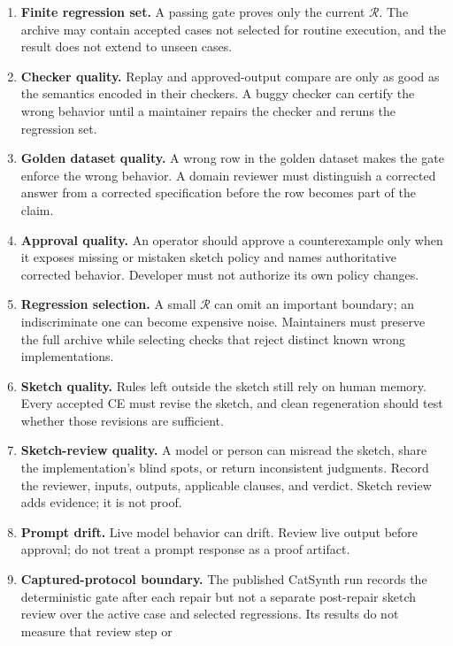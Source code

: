 \documentclass[11pt]{article}
\newcommand{\regression}{\mathcal{R}}
\begin{document}
\begin{enumerate}
  \item \textbf{Finite regression set.}  A passing gate proves only the current
        $\regression$.  The archive may contain accepted cases not selected for routine
        execution, and the result does not extend to unseen cases.
  \item \textbf{Checker quality.}  Replay and approved-output compare are only as good as the
        semantics encoded in their checkers.  A buggy checker can certify the wrong
        behavior until a maintainer repairs the checker and reruns the regression set.
  \item \textbf{Golden dataset quality.}  A wrong row in the golden dataset makes
        the gate enforce the wrong behavior.  A domain reviewer must distinguish a
        corrected answer from a corrected specification before the row becomes part
        of the claim.
  \item \textbf{Approval quality.}  An operator should approve a counterexample only when it
        exposes missing or mistaken sketch policy and names authoritative corrected behavior.
        Developer must not authorize its own policy changes.
  \item \textbf{Regression selection.}  A small $\regression$ can omit an important boundary;
        an indiscriminate one can become expensive noise.  Maintainers must preserve the full
        archive while selecting checks that reject distinct known wrong implementations.
  \item \textbf{Sketch quality.}  Rules left outside the sketch still rely on human memory.
        Every accepted CE must revise the sketch, and clean regeneration should test whether
        those revisions are sufficient.
  \item \textbf{Sketch-review quality.}  A model or person can misread the sketch, share the
        implementation's blind spots, or return inconsistent judgments.  Record the reviewer,
        inputs, outputs, applicable clauses, and verdict.  Sketch review adds evidence; it is not
        proof.
  \item \textbf{Prompt drift.}  Live model behavior can drift.  Review live output
        before approval; do not treat a prompt response as a proof artifact.
  \item \textbf{Captured-protocol boundary.}  The published CatSynth run records the
        deterministic gate after each repair but not a separate post-repair sketch review over
        the active case and selected regressions.  Its results do not measure that review step or

\end{enumerate}
\end{document}
